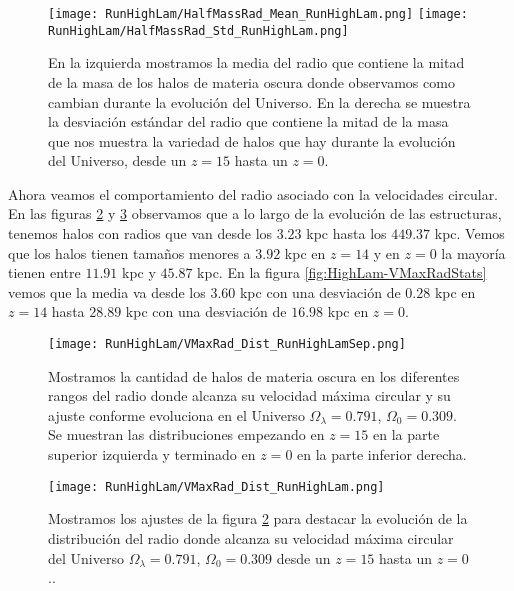 \begin{figure}[H]
    \centering
    \texttt{[image: RunHighLam/HalfMassRad\_Mean\_RunHighLam.png]}
    \texttt{[image: RunHighLam/HalfMassRad\_Std\_RunHighLam.png]}
    \caption[Media y desviación estándar del radio de la mitad de la masa]{\footnotesize En la izquierda mostramos la media del radio que contiene la mitad de la masa de los halos de materia oscura donde observamos como cambian durante la evolución del Universo. En la derecha se muestra la desviación estándar del radio que contiene la mitad de la masa que nos muestra la variedad de halos que hay durante la evolución del Universo, desde un $z=15$ hasta un $z=0$.}
    \label{fig:HighLam-HalfMassRadStats}
\end{figure}

Ahora veamos el comportamiento del radio asociado con la velocidades circular. En las figuras \ref{fig:HighLam-VMaxRadDistSep} y \ref{fig:HighLam-VMaxRadDist} observamos que a lo largo de la evolución de las estructuras, tenemos halos con radios que van desde los $3.23$ kpc hasta los $449.37$ kpc. Vemos que los halos tienen tamaños menores a $3.92$ kpc en $z=14$  y en $z=0$ la mayoría tienen entre $11.91$ kpc y $45.87$ kpc. En la figura \ref{fig:HighLam-VMaxRadStats} vemos que la media va desde los $3.60$ kpc con una desviación de $0.28$ kpc en $z=14$ hasta $28.89$ kpc con una desviación de $16.98$ kpc en $z=0$.

\begin{figure}[H]
    \centering
    \texttt{[image: RunHighLam/VMaxRad\_Dist\_RunHighLamSep.png]}
    \caption[Radio donde se alcanza la velocidad máxima circular]{\footnotesize Mostramos la cantidad de halos de materia oscura en los diferentes rangos del radio donde alcanza su velocidad máxima circular y su ajuste conforme evoluciona en el Universo $\Omega_\lambda = 0.791$, $\Omega_0 = 0.309$. Se muestran las distribuciones empezando en $z=15$ en la parte superior izquierda y terminado en $z=0$ en la parte inferior derecha.}
    \label{fig:HighLam-VMaxRadDistSep}
\end{figure}

\begin{figure}[H]
    \centering
    \texttt{[image: RunHighLam/VMaxRad\_Dist\_RunHighLam.png]}
    \caption[Distribución del radio donde se alcanza la velocidad máxima circular]{\footnotesize Mostramos los ajustes de la figura \ref{fig:HighLam-VMaxRadDistSep} para destacar la evolución de la distribución del radio donde alcanza su velocidad máxima circular del Universo $\Omega_\lambda = 0.791$, $\Omega_0 = 0.309$ desde un $z=15$ hasta un $z=0$..}
    \label{fig:HighLam-VMaxRadDist}
\end{figure}

